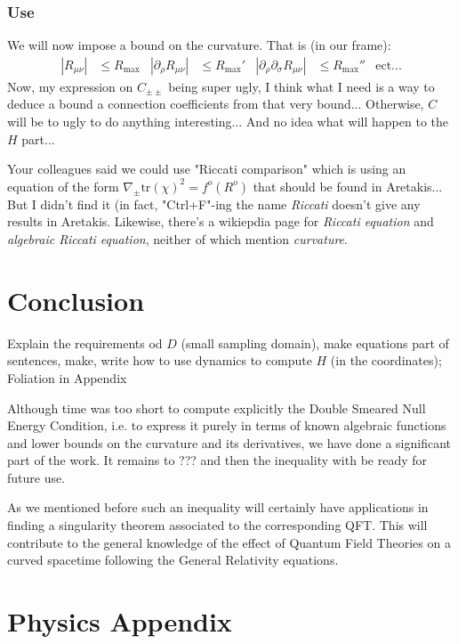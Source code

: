 \documentclass[a4paper,11pt]{article}
\numberwithin{equation}{section}
\theoremstyle{definition}
\begin{document}
\subsubsection{Use}
We will now impose a bound on the curvature. That is (in our frame):
\begin{align}
    |R_{\mu\nu}| &\leq R_\mathrm{max}&
    |\partial_\rho R_{\mu\nu}| &\leq
    R_\mathrm{max}'&
    |\partial_\rho\partial_\sigma
    R_{\mu\nu}| & \leq R_\mathrm{max}''&
    \mathrm{ect}...
\end{align}
\color{red} Now, my expression on $C_{\pm\pm}$ being super ugly, I think what I need is a way to deduce a bound a connection coefficients from that very bound... Otherwise, $C$ will be to ugly to do anything interesting... And no idea what will happen to the $H$ part... 

Your colleagues said we could use "Riccati comparison" which is using an equation of the form $\nabla_\pm \mathrm{tr}(\chi)^2 = f^o(R^o)$ that should be found in Aretakis... But I didn't find it (in fact, "Ctrl+F"-ing the name \emph{Riccati} doesn't  give any results in Aretakis. Likewise, there's a wikiepdia page for \emph{Riccati equation} and \emph{algebraic Riccati equation}, neither of which mention \emph{curvature}. \color{black}

\section{Conclusion}
\color{red} Explain the requirements od $D$ (small sampling domain), make equations part of sentences, make, write how to use dynamics to compute $H$ (in the coordinates); Foliation in Appendix \color{black}

Although time was too short to compute explicitly the Double Smeared Null Energy Condition, i.e. to express it purely in terms of known algebraic functions and lower bounds on the curvature and its derivatives, we have done a significant part of the work. It remains to \color{red} ??? \color{black} and then the inequality with be ready for future use.

As we mentioned before such an inequality will certainly have applications in finding a singularity theorem associated to the corresponding QFT. This will contribute to the general knowledge of the effect of Quantum Field Theories on a curved spacetime following the General Relativity equations.
\newpage
\appendix
\section{Physics Appendix}
\end{document}
